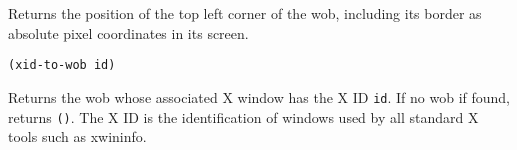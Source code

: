 

Returns the position of the top left corner of the wob, including its border
as absolute pixel coordinates in its screen.

        
{\usagefont\begin{verbatim}
(xid-to-wob id)
\end{verbatim}}\usageupspace

Returns the wob whose associated X window has the X ID \verb|id|. If no wob if
found, returns \verb|()|. The X ID is the identification of windows used by
all standard X tools such as {\sc xwininfo}.
